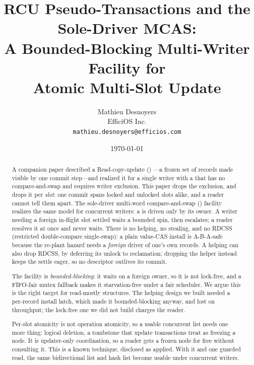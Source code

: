\documentclass[11pt]{article}
\title{RCU Pseudo-Transactions and the Sole-Driver MCAS:\\
       A Bounded-Blocking Multi-Writer Facility for\\
       Atomic Multi-Slot Update}
\author{Mathieu Desnoyers\\ EfficiOS Inc.\\ \texttt{mathieu.desnoyers@efficios.com}}
\date{\today}
\begin{document}
\maketitle

\begin{abstract}
A companion paper described a Read-copy-update (\rcu) \pseudotxn---a frozen set of
 records made visible by one commit step---and realized
it for a single writer with a \fliplatch that has no compare-and-swap and
requires writer exclusion. This paper drops the exclusion, and drops it per
\emph{slot}: one commit spans locked and unlocked slots alike, and a reader
cannot tell them apart. The sole-driver
multi-word compare-and-swap (\mcas) facility realizes the same model for concurrent
writers: a \pseudotxn is driven only by its owner. A writer needing a foreign
in-flight slot settled waits a bounded spin, then escalates; a reader resolves it
at once and never waits. There is no helping, no stealing, and no RDCSS
(restricted double-compare single-swap): a plain value-CAS install is
A-B-A-safe because the re-plant hazard needs a \emph{foreign} driver of one's
own records. A helping \mcas can also drop RDCSS, by deferring its unlock to
reclamation; dropping the helper instead keeps the settle eager, so no
descriptor outlives its commit.

The facility is \emph{bounded-blocking}: it waits on a foreign owner, so it is
not lock-free, and a FIFO-fair mutex fallback makes it starvation-free under a
fair scheduler. We argue this is the right target for read-mostly structures.
The helping design we built needed a per-record install latch, which made it
bounded-blocking anyway, and lost on throughput; the lock-free one we did
not build charges the reader.

Per-slot atomicity is not operation atomicity, so a usable concurrent list needs
one more thing: logical deletion, a tombstone that update transactions treat as
freezing a node. It is updater-only coordination, so a reader gets a
frozen node for free without consulting it. This is a known
technique, disclosed as applied. With it and one guarded read, the same
bidirectional list and hash list become usable under concurrent writers.
\end{abstract}
\end{document}
